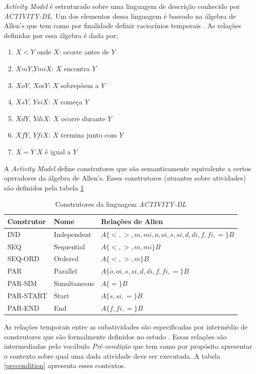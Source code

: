 \textit{Activity Model} é estruturado sobre uma linguagem de descrição conhecido por \textit{ACTIVITY-DL}. 
Um dos elementos dessa linguagem é baseado na álgebra de Allen's que tem como por finalidade definir raciocínios temporais \cite{allenalgebric}. 
As relações definidas por essa álgebra é dada por; 

\begin{enumerate}
	\item $X < Y$ onde $X$: ocorre antes de $Y$ 
	\item $X m Y$,$Y mi X$: $X$ encontra $Y$
	\item $X o Y$, $X oi Y$: $X$ sobrepõem a $Y$
	\item $X s Y$, $Y si X$: $X$ começa $Y$
	\item $X d Y$, $Y di X$: $X$ ocorre durante $Y$	  
	\item $X f Y$, $Y fi X$: $X$ termina junto com $Y$	  	
	\item $X = Y$ $X$ é igual a $Y$	  		
\end{enumerate}

A \textit{Activity Model} define construtores que são semanticamente equivalente a certos operadores da álgebra de Allen's. 
Esses construtores (atuantes sobre atividades) são definidos pela tabela \ref{acticonstruct}

\begin{table}[H]
\centering
\begin{tabular}{|l|l|l|}
\hline
Construtor & Nome         & Relações de Allen \\ \hline
IND        & Independent  & $A \{ <,>,m,mi,o,oi,s,si,d,di,f,fi,= \} B$\\ \hline
SEQ        & Sequential   & $A \{ <,>,m,mi \} B$\\ \hline
SEQ-ORD    & Ordered      & $A \{ <,>,m \} B$\\ \hline
PAR        & Parallel     & $A \{ o,oi,s,si,d,di,f,fi,= \} B$ \\ \hline
PAR-SIM    & Simultaneous & $A \{ = \} B$\\ \hline
PAR-START  & Start        & $A \{ s,si,= \} B$\\ \hline
PAR-END    & End          & $A \{ f,fi,= \} B$ \\ \hline
\end{tabular}
\caption{Construtores da linguagem \textit{ACTIVITY-DL} \cite{v3sframework}}
\label{acticonstruct}
\end{table}

As relações temporais entre as subatividades são especificadas por intermédio de construtores que são formalmente definidos no estudo \cite{allenalgebric}. 
Essas relações são intermediadas pelo vocábulo \textit{Pré-condição} que tem como por propósito apresentar o contexto sobre qual uma dada atividade deve ser executada. 
A tabela \ref{precondition} apresenta esses contextos.

